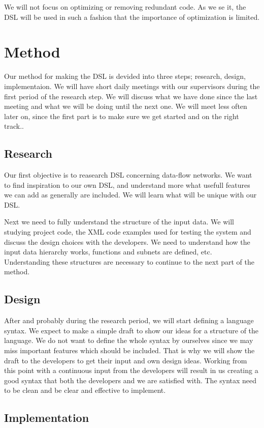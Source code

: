 \documentclass[a4paper]{article}
\begin{document}
We will not focus on optimizing or removing redundant code. As we se
it, the DSL will be used in such a fashion that the importance of
optimization is limited.

\section{Method}
Our method for making the DSL is devided into three steps; research,
design, implementaion. We will have short daily meetings with our
supervisors during the first period of the research step. We will
discuss what we have done since the last meeting and what we will be
doing until the next one. We will meet less often later on, since the
first part is to make sure we get started and on the right track..

\subsection{Research}
Our first objective is to reasearch DSL concerning data-flow
networks. We want to find inspiration to our own DSL, and understand
more what usefull features we can add as generally are included. We
will learn what will be unique with our DSL.

Next we need to fully understand the structure of the input data. We
will studying project code, the XML code examples used for testing the
system and discuss the design choices with the developers. We need to
understand how the input data hierarchy works, functions and subnets
are defined, etc. Understanding these structures are necessary to
continue to the next part of the method.

\subsection{Design}
After and probably during the research period, we will start defining
a language syntax. We expect to make a simple draft to show our ideas
for a structure of the language. We do not want to define the whole
syntax by ourselves since we may miss important features which should
be included. That is why we will show the draft to the developers to
get their input and own design ideas. Working from this point with a
continuous input from the developers will result in us creating a good
syntax that both the developers and we are satisfied with. The syntax
need to be clean and be clear and effective to implement.

\subsection{Implementation}
\end{document}
